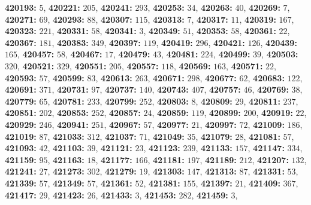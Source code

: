 \textsf{\bfseries 420193:} $5$, \textsf{\bfseries 420221:} $205$, \textsf{\bfseries 420241:} $293$, \textsf{\bfseries 420253:} $34$, \textsf{\bfseries 420263:} $40$, \textsf{\bfseries 420269:} $7$, \textsf{\bfseries 420271:} $69$, \textsf{\bfseries 420293:} $88$, \textsf{\bfseries 420307:} $115$, \textsf{\bfseries 420313:} $7$, \textsf{\bfseries 420317:} $11$, \textsf{\bfseries 420319:} $167$, \textsf{\bfseries 420323:} $221$, \textsf{\bfseries 420331:} $58$, \textsf{\bfseries 420341:} $3$, \textsf{\bfseries 420349:} $51$, \textsf{\bfseries 420353:} $58$, \textsf{\bfseries 420361:} $22$, \textsf{\bfseries 420367:} $181$, \textsf{\bfseries 420383:} $349$, \textsf{\bfseries 420397:} $119$, \textsf{\bfseries 420419:} $296$, \textsf{\bfseries 420421:} $126$, \textsf{\bfseries 420439:} $165$, \textsf{\bfseries 420457:} $58$, \textsf{\bfseries 420467:} $17$, \textsf{\bfseries 420479:} $43$, \textsf{\bfseries 420481:} $224$, \textsf{\bfseries 420499:} $39$, \textsf{\bfseries 420503:} $320$, \textsf{\bfseries 420521:} $329$, \textsf{\bfseries 420551:} $205$, \textsf{\bfseries 420557:} $118$, \textsf{\bfseries 420569:} $163$, \textsf{\bfseries 420571:} $22$, \textsf{\bfseries 420593:} $57$, \textsf{\bfseries 420599:} $83$, \textsf{\bfseries 420613:} $263$, \textsf{\bfseries 420671:} $298$, \textsf{\bfseries 420677:} $62$, \textsf{\bfseries 420683:} $122$, \textsf{\bfseries 420691:} $371$, \textsf{\bfseries 420731:} $97$, \textsf{\bfseries 420737:} $140$, \textsf{\bfseries 420743:} $407$, \textsf{\bfseries 420757:} $46$, \textsf{\bfseries 420769:} $38$, \textsf{\bfseries 420779:} $65$, \textsf{\bfseries 420781:} $233$, \textsf{\bfseries 420799:} $252$, \textsf{\bfseries 420803:} $8$, \textsf{\bfseries 420809:} $29$, \textsf{\bfseries 420811:} $237$, \textsf{\bfseries 420851:} $202$, \textsf{\bfseries 420853:} $252$, \textsf{\bfseries 420857:} $24$, \textsf{\bfseries 420859:} $119$, \textsf{\bfseries 420899:} $200$, \textsf{\bfseries 420919:} $22$, \textsf{\bfseries 420929:} $246$, \textsf{\bfseries 420941:} $251$, \textsf{\bfseries 420967:} $57$, \textsf{\bfseries 420977:} $21$, \textsf{\bfseries 420997:} $72$, \textsf{\bfseries 421009:} $186$, \textsf{\bfseries 421019:} $87$, \textsf{\bfseries 421033:} $312$, \textsf{\bfseries 421037:} $71$, \textsf{\bfseries 421049:} $35$, \textsf{\bfseries 421079:} $28$, \textsf{\bfseries 421081:} $57$, \textsf{\bfseries 421093:} $42$, \textsf{\bfseries 421103:} $39$, \textsf{\bfseries 421121:} $23$, \textsf{\bfseries 421123:} $239$, \textsf{\bfseries 421133:} $157$, \textsf{\bfseries 421147:} $334$, \textsf{\bfseries 421159:} $95$, \textsf{\bfseries 421163:} $18$, \textsf{\bfseries 421177:} $166$, \textsf{\bfseries 421181:} $197$, \textsf{\bfseries 421189:} $212$, \textsf{\bfseries 421207:} $132$, \textsf{\bfseries 421241:} $27$, \textsf{\bfseries 421273:} $302$, \textsf{\bfseries 421279:} $19$, \textsf{\bfseries 421303:} $147$, \textsf{\bfseries 421313:} $87$, \textsf{\bfseries 421331:} $53$, \textsf{\bfseries 421339:} $57$, \textsf{\bfseries 421349:} $57$, \textsf{\bfseries 421361:} $52$, \textsf{\bfseries 421381:} $155$, \textsf{\bfseries 421397:} $21$, \textsf{\bfseries 421409:} $367$, \textsf{\bfseries 421417:} $29$, \textsf{\bfseries 421423:} $26$, \textsf{\bfseries 421433:} $3$, \textsf{\bfseries 421453:} $282$, \textsf{\bfseries 421459:} $3$, 
